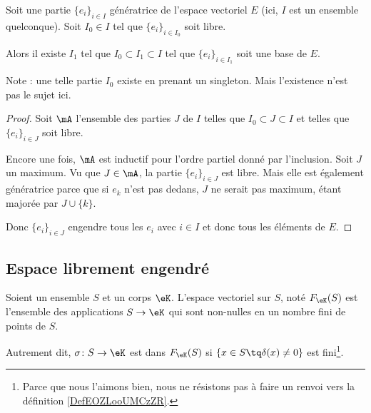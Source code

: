 \begin{theorem}      \label{THOooOQLQooHqEeDK}
    Soit une partie \( \{ e_i \}_{i\in I}\) génératrice de l'espace vectoriel \( E\) (ici, \( I\) est un ensemble quelconque). Soit \( I_0\in I\) tel que \( \{ e_i \}_{i\in I_0}\) soit libre.

    Alors il existe \( I_1\) tel que \( I_0\subset I_1\subset I\) tel que \( \{ e_i \}_{i\in I_1}\) soit une base de \( E\).
\end{theorem}

Note : une telle partie \( I_0\) existe en prenant un singleton. Mais l'existence n'est pas le sujet ici.

\begin{proof}
    Soit \( \mA\) l'ensemble des parties \( J\) de \( I\) telles que \( I_0\subset J\subset I\) et telles que \( \{ e_i \}_{i\in J}\) soit libre.

    Encore une fois, \( \mA\) est inductif pour l'ordre partiel donné par l'inclusion. Soit \( J\) un maximum. Vu que \( J\in\mA\), la partie \( \{ e_i \}_{i\in J}\) est libre. Mais elle est également génératrice parce que si \( e_k\) n'est pas dedans, \( J\) ne serait pas maximum, étant majorée par \( J\cup\{ k \}\).

    Donc \( \{ e_i \}_{i\in J}\) engendre tous les \( e_i\) avec \( i\in I\) et donc tous les éléments de \( E\).
\end{proof}

\subsection{Espace librement engendré}

\begin{definition}       \label{DEFooCPNIooNxsYMY}
    Soient un ensemble \( S\) et un corps \(\eK \). L'espace vectoriel  sur \( S\), noté \( F_{\eK}(S)\) est l'ensemble des applications \( S\to \eK\) qui sont non-nulles en un nombre fini de points de \( S\).

    Autrement dit, \( \sigma\colon S\to \eK\) est dans \( F_{\eK}(S) \) si \( \{ x\in S\tq \delta(x)\neq 0 \}\) est fini\footnote{Parce que nous l'aimons bien, nous ne résistons pas à faire un renvoi vers la définition \ref{DefEOZLooUMCzZR}.}.
\end{definition}

